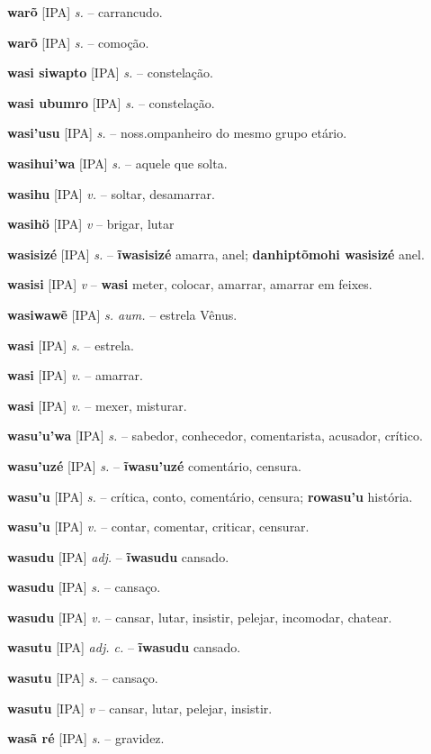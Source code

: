 \textbf{warõ} [IPA] \textit{s.} -- carrancudo.

\textbf{warõ} [IPA] \textit{s.} -- comoção.

\textbf{wasi siwapto} [IPA] \textit{s.} -- constelação.

\textbf{wasi ubumro} [IPA] \textit{s.} -- constelação.

\textbf{wasi'usu} [IPA] \textit{s.} -- noss.ompanheiro do mesmo grupo etário.

\textbf{wasihui'wa} [IPA] \textit{s.} -- aquele que solta.

\textbf{wasihu} [IPA] \textit{v.} -- soltar, desamarrar.

\textbf{wasihö} [IPA] \textit{v} -- {brigar, lutar}

\textbf{wasisizé} [IPA] \textit{s.} -- \textbf{ĩwasisizé} amarra, anel; \textbf{danhiptõmohi wasisizé} anel.

\textbf{wasisi} [IPA] \textit{v} -- \textbf{wasi} meter, colocar, amarrar, amarrar em feixes.

\textbf{wasiwawẽ} [IPA] \textit{s. aum.} -- estrela Vênus.

\textbf{wasi} [IPA] \textit{s.} -- estrela.

\textbf{wasi} [IPA] \textit{v.} -- amarrar.

\textbf{wasi} [IPA] \textit{v.} -- mexer, misturar.

\textbf{wasu'u'wa} [IPA] \textit{s.} -- sabedor, conhecedor, comentarista, acusador, crítico.

\textbf{wasu'uzé} [IPA] \textit{s.} -- \textbf{ĩwasu'uzé} comentário, censura.

\textbf{wasu'u} [IPA] \textit{s.} -- crítica, conto, comentário, censura; \textbf{rowasu'u} história.

\textbf{wasu'u} [IPA] \textit{v.} -- contar, comentar, criticar, censurar.

\textbf{wasudu} [IPA] \textit{adj.} -- \textbf{ĩwasudu} cansado.

\textbf{wasudu} [IPA] \textit{s.} -- cansaço.

\textbf{wasudu} [IPA] \textit{v.} -- cansar, lutar, insistir, pelejar, incomodar, chatear.

\textbf{wasutu} [IPA] \textit{adj. c.} -- \textbf{ĩwasudu} cansado.

\textbf{wasutu} [IPA] \textit{s.} -- cansaço.

\textbf{wasutu} [IPA] \textit{v} -- cansar, lutar, pelejar, insistir.

\textbf{wasã ré} [IPA] \textit{s.} -- gravidez.

